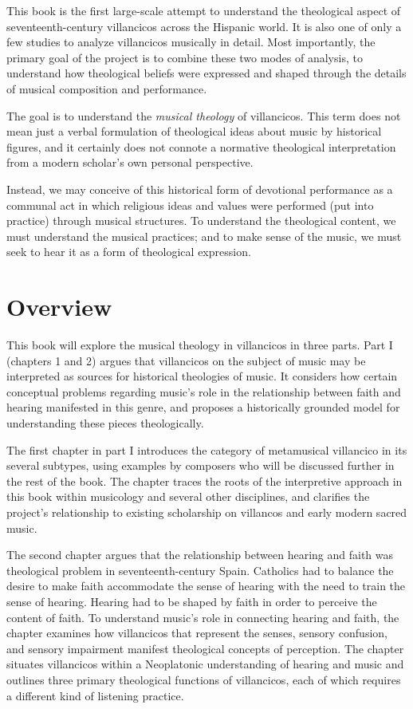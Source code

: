 \documentclass[oneside,12pt]{book}
\begin{document}
    This book is the first large-scale attempt to understand the theological aspect of seventeenth-century villancicos across the Hispanic world.
    It is also one of only a few studies to analyze villancicos musically in detail.
    Most importantly, the primary goal of the project is to combine these two modes of analysis, to understand how theological beliefs were expressed and shaped through the details of musical composition and performance.
  
    The goal is to understand the \emph{musical theology} of villancicos.
    This term does not mean just a verbal formulation of theological ideas about music by historical figures, and it certainly does not connote a normative theological interpretation from a modern scholar’s own personal perspective.
    
    Instead, we may conceive of this historical form of devotional performance as a communal act in which religious ideas and values were performed (put into practice) through musical structures.
    To understand the theological content, we must understand the musical practices; and to make sense of the music, we must seek to hear it as a form of theological expression.
  
\section{Overview}
\label{ch1:overview}

      This book will explore the musical theology in villancicos in three parts.
      Part I (chapters 1 and 2) argues that villancicos on the subject of music may be interpreted as sources for historical theologies of music.
      It considers how certain conceptual problems regarding music’s role in the relationship between faith and hearing manifested in this genre, and proposes a historically grounded model for understanding these pieces theologically.
    
      The first chapter in part I introduces the category of metamusical villancico in its several subtypes, using examples by composers who will be discussed further in the rest of the book.
      The chapter traces the roots of the interpretive approach in this book within musicology and several other disciplines, and clarifies the project’s relationship to existing scholarship on villancos and early modern sacred music.
    
      The second chapter argues that the relationship between hearing and faith was theological problem in seventeenth-century Spain.
      Catholics had to balance the desire to make faith accommodate the sense of hearing with the need to train the sense of hearing.
      Hearing had to be shaped by faith in order to perceive the content of faith.
      To understand music’s role in connecting hearing and faith, the chapter examines how villancicos that represent the senses, sensory confusion, and sensory impairment manifest theological concepts of perception.
      The chapter situates villancicos within a Neoplatonic understanding of hearing and music and outlines three primary theological functions of villancicos, each of which requires a different kind of listening practice.
    
\end{document}
